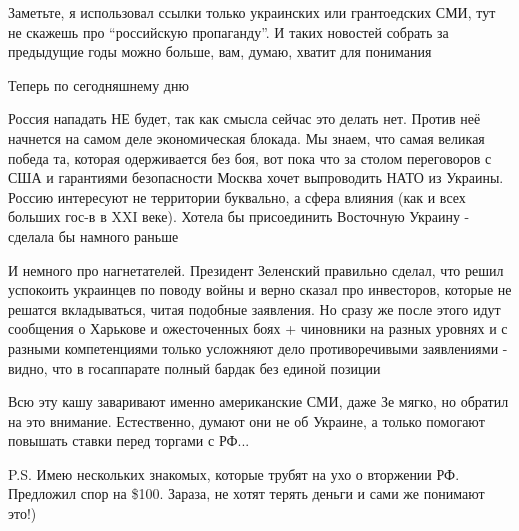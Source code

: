 Заметьте,
я использовал ссылки только украинских или грантоедских СМИ, тут не скажешь
про \enquote{российскую пропаганду}. И таких новостей собрать за предыдущие годы можно
больше, вам, думаю, хватит для понимания

Теперь по сегодняшнему дню

Россия нападать НЕ будет, так как смысла сейчас это делать нет. Против неё
начнется на самом деле экономическая блокада. Мы знаем, что самая великая
победа та, которая одерживается без боя, вот пока что за столом переговоров с
США и гарантиями безопасности Москва хочет выпроводить НАТО из Украины. Россию
интересуют не территории буквально, а сфера влияния (как и всех больших гос-в в
XXI веке). Хотела бы присоединить Восточную Украину - сделала бы намного раньше

И немного про нагнетателей. Президент Зеленский правильно сделал, что решил
успокоить украинцев по поводу войны и верно сказал про инвесторов, которые не
решатся вкладываться, читая подобные заявления. Но сразу же после этого идут
сообщения о Харькове и ожесточенных боях + чиновники на разных уровнях и с
разными компетенциями только усложняют дело противоречивыми заявлениями -
видно, что в госаппарате полный бардак без единой позиции

Всю эту кашу заваривают именно американские СМИ, даже Зе мягко, но обратил на
это внимание. Естественно, думают они не об Украине, а только помогают повышать
ставки перед торгами с РФ...

P.S. Имею нескольких знакомых, которые трубят на ухо о вторжении РФ. Предложил
спор на \$100. Зараза, не хотят терять деньги и сами же понимают это!)
